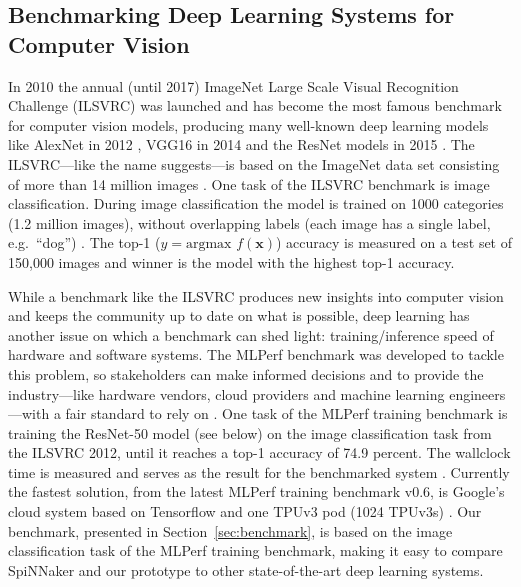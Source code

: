 \documentclass[]{article}
\begin{document}


\subsection{Benchmarking Deep Learning Systems for Computer Vision} %
\label{subsec:intro_bench}

In 2010 the annual (until 2017) ImageNet Large Scale Visual
Recognition Challenge (ILSVRC) was launched and has become the most
famous benchmark for computer vision models, producing many well-known
deep learning models like AlexNet in 2012
\citep{krizhevsky_et_al_2012}, VGG16 in 2014
\citep{simonyan_et_al_2014} and the ResNet models in 2015
\citep{he_et_al_2015}.
The ILSVRC---like the name suggests---is based on the ImageNet data
set consisting of more than 14 million images
\citep{russakovsky_et_al_2015}.
One task of the ILSVRC benchmark is image classification.
During image classification the model is trained on 1000 categories
(1.2 million images), without overlapping labels (each image has a
single label, e.g.~``dog'') \citep{russakovsky_et_al_2015}.
The top-1 ($y = \text{argmax } f(\mathbf{x})$) accuracy is measured on
a test set of 150,000 images and winner is the model with the highest
top-1 accuracy.

While a benchmark like the ILSVRC produces new insights into computer
vision and keeps the community up to date on what is possible,
deep learning has another issue on which a benchmark can shed light:
training/inference speed of hardware and software systems.
The MLPerf benchmark was developed to tackle this problem, so
stakeholders can make informed decisions and to provide the
industry---like hardware vendors, cloud providers and machine learning
engineers---with a fair standard to rely on
\citep{mattson_et_al_2019}.
One task of the MLPerf training benchmark is training the ResNet-50
model (see below) on the image classification task from the ILSVRC
2012, until it reaches a top-1 accuracy of 74.9 percent.
The wallclock time is measured and serves as the result for the
benchmarked system \citep{mattson_et_al_2019}.
Currently the fastest solution, from the latest MLPerf training
benchmark v0.6, is Google's cloud system based on Tensorflow and
one TPUv3 pod (1024 TPUv3s) \citep{mlperf_2019, stone_2019}.
Our benchmark, presented in Section~\ref{sec:benchmark}, is based
on the image classification task of the MLPerf training benchmark,
making it easy to compare SpiNNaker and our prototype to other
state-of-the-art deep learning systems.
\end{document}

